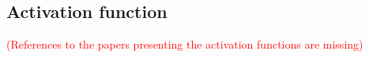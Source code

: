 %
%
%

\subsection{Activation function\label{activation_fn}}

\textcolor{red}{(References to the papers presenting the activation functions
    are missing)}

